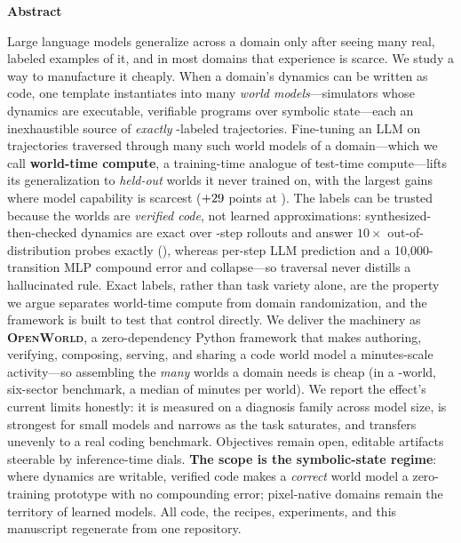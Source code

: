 \documentclass[11pt]{article}
\newcommand{\openworld}{\textsc{OpenWorld}}
\begin{document}
\vspace{0.5em}
\begin{tcolorbox}[breakable, enhanced jigsaw, colback=black!4, colframe=black!4,
  arc=5pt, boxrule=0pt, left=16pt, right=16pt, top=10pt, bottom=10pt]
\setlength{\parskip}{0pt}
{\centering\large\bfseries Abstract\par}
\smallskip
\fontsize{9.5}{11.3}\selectfont
Large language models generalize across a domain only after seeing many real, labeled
examples of it, and in most domains that experience is scarce. We study a way to
manufacture it cheaply. When a domain's dynamics can be written as code, one template
instantiates into many \emph{world models}---simulators whose dynamics are executable,
verifiable programs over symbolic state---each an inexhaustible source of \emph{exactly}%
-labeled trajectories. Fine-tuning an LLM on trajectories traversed through many such world
models of a domain---which we call \textbf{world-time compute}, a training-time analogue of
test-time compute---lifts its generalization to \emph{held-out} worlds it never trained on,
with the largest gains where model capability is scarcest ($+29$ points at
\WTSmallName). The labels can be trusted because the worlds are \emph{verified code}, not
learned approximations: synthesized-then-checked dynamics are exact over
\RolloutSteps-step rollouts and answer $10\times$ out-of-distribution probes exactly
(\CodeOODRate), whereas per-step LLM prediction and a 10{,}000-transition MLP compound
error and collapse---so traversal never distills a hallucinated rule. Exact labels, rather
than task variety alone, are the property we argue separates world-time compute from domain
randomization, and the framework is built to test that control directly. We deliver the
machinery as \textbf{\openworld}, a zero-dependency Python framework that makes authoring,
verifying, composing, serving, and sharing a code world model a minutes-scale
activity---so assembling the \emph{many} worlds a domain needs is cheap (in a
\ProtoNumWorlds-world, six-sector benchmark, a median of \ProtoMedianMinutes{} minutes per
world). We report the effect's current limits honestly: it is measured on a diagnosis
family across model size, is strongest for small models and narrows as the task saturates,
and transfers unevenly to a real coding benchmark. Objectives remain open, editable
artifacts steerable by inference-time dials. \textbf{The scope is the symbolic-state
regime}: where dynamics are writable, verified code makes a \emph{correct} world model a
zero-training prototype with no compounding error; pixel-native domains remain the
territory of learned models. All code, the \ProtoNumWorlds{} recipes, experiments, and this
manuscript regenerate from one repository.


\end{tcolorbox}
\end{document}
